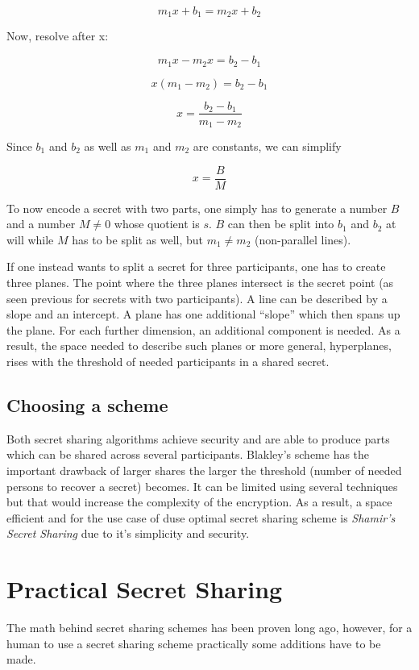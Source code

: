 $$m_1x + b_1 = m_2x + b_2$$

Now, resolve after x:

$$m_1x - m_2x = b_2 - b_1 $$

$$x (m_1 - m_2) = b_2 - b_1$$

$$x = \frac{b_2 - b_1}{m_1 - m_2}$$

Since $b_1$ and $b_2$ as well as $m_1$ and $m_2$ are constants, we can simplify

$$x = \frac{B}{M}$$

To now encode a secret with two parts, one simply has to generate a number $B$
and a number $M \neq 0$ whose quotient is $s$.
$B$ can then be split into $b_1$ and $b_2$ at will
while $M$ has to be split as well, but $m_1 \neq m_2$ (non-parallel lines).

If one instead wants to split a secret for three participants, one has to
create three planes. The point where the three planes intersect
is the secret point (as seen previous for secrets with two participants).
A line can be described by a slope and an intercept. A plane has one
additional ``slope'' which then spans up the plane. For each further
dimension, an additional component is needed. As a result, the space needed
to describe such planes or more general, hyperplanes, rises with the
threshold of needed participants in a shared secret.

\subsection{Choosing a scheme}

Both secret sharing algorithms achieve security and are able to produce
parts which can be shared across several participants. Blakley's scheme
has the important drawback of larger shares the larger the threshold (number
of needed persons to recover a secret) becomes. It can be limited using
several techniques but that would increase the complexity of the encryption.
As a result, a space efficient and for the use case of duse optimal secret sharing
scheme is \textit{Shamir's Secret Sharing} due to it's simplicity and
security.

\section{Practical Secret Sharing}

The math behind secret sharing schemes has been proven long ago, however, for a
human to use a secret sharing scheme practically some additions have to be
made.

